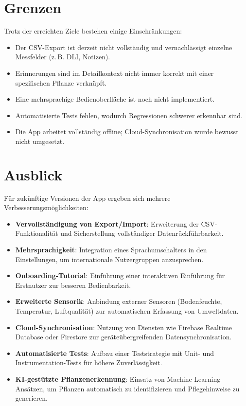 \documentclass[14pt,a4paper]{report}
\begin{document}
\section{Grenzen}
Trotz der erreichten Ziele bestehen einige Einschränkungen:
\begin{itemize}
    \item Der CSV-Export ist derzeit nicht vollständig und vernachlässigt einzelne Messfelder (z.\,B. DLI, Notizen).
    \item Erinnerungen sind im Detailkontext nicht immer korrekt mit einer spezifischen Pflanze verknüpft.
    \item Eine mehrsprachige Bedienoberfläche ist noch nicht implementiert.
    \item Automatisierte Tests fehlen, wodurch Regressionen schwerer erkennbar sind.
    \item Die App arbeitet vollständig offline; Cloud-Synchronisation wurde bewusst nicht umgesetzt.
\end{itemize}

\section{Ausblick}
Für zukünftige Versionen der App ergeben sich mehrere Verbesserungsmöglichkeiten:
\begin{itemize}
    \item \textbf{Vervollständigung von Export/Import}: Erweiterung der CSV-Funktionalität und Sicherstellung vollständiger Datenrückführbarkeit.
    \item \textbf{Mehrsprachigkeit}: Integration eines Sprachumschalters in den Einstellungen, um internationale Nutzergruppen anzusprechen.
    \item \textbf{Onboarding-Tutorial}: Einführung einer interaktiven Einführung für Erstnutzer zur besseren Bedienbarkeit.
    \item \textbf{Erweiterte Sensorik}: Anbindung externer Sensoren (Bodenfeuchte, Temperatur, Luftqualität) zur automatischen Erfassung von Umweltdaten.
    \item \textbf{Cloud-Synchronisation}: Nutzung von Diensten wie Firebase Realtime Database oder Firestore zur geräteübergreifenden Datensynchronisation.
    \item \textbf{Automatisierte Tests}: Aufbau einer Teststrategie mit Unit- und Instrumentation-Tests für höhere Zuverlässigkeit.
    \item \textbf{KI-gestützte Pflanzenerkennung}: Einsatz von Machine-Learning-Ansätzen, um Pflanzen automatisch zu identifizieren und Pflegehinweise zu generieren.
\end{itemize}
\end{document}
